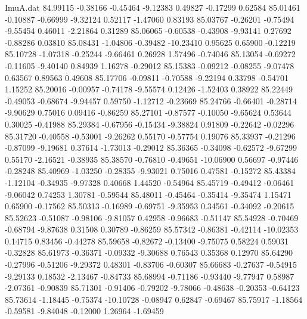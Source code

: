 \begin{filecontents}{ImuA.dat}
  84.99115   -0.38166   -0.45464   -9.12383    0.49827   -0.17299    0.62584
  85.01461   -0.10887   -0.66999   -9.32124    0.52117   -1.47060    0.83193
  85.03767   -0.26201   -0.75494   -9.55454    0.46011   -2.21864    0.31289
  85.06065   -0.60538   -0.43908   -9.93141    0.27692   -0.88286    0.03810
  85.08431   -1.04806   -0.39482  -10.23410    0.95625    0.65900   -0.12219
  85.10728   -1.07318   -0.25244   -9.66461    0.26928    1.57496   -0.74046
  85.13054   -0.69272   -0.11605   -9.40140    0.84939    1.16278   -0.29012
  85.15383   -0.09212   -0.08255   -9.07478    0.63567    0.89563    0.49608
  85.17706   -0.09811   -0.70588   -9.22194    0.33798   -0.54701    1.15252
  85.20016   -0.00957   -0.74178   -9.55574    0.12426   -1.52403    0.38922
  85.22449   -0.49053   -0.68674   -9.94457    0.59750   -1.12712   -0.23669
  85.24766   -0.66401   -0.28714   -9.90629    0.75016    0.09416   -0.86259
  85.27101   -0.87577   -0.10050   -9.65624    0.53644    0.30025   -0.41988
  85.29384   -0.67956   -0.15434   -9.38824    0.91809   -0.22642   -0.02296
  85.31720   -0.40558   -0.53001   -9.26262    0.55170   -0.57754    0.19076
  85.33937   -0.21296   -0.87099   -9.19681    0.37614   -1.73013   -0.29012
  85.36365   -0.34098   -0.62572   -9.67299    0.55170   -2.16521   -0.38935
  85.38570   -0.76810   -0.49651  -10.06900    0.56697   -0.97446   -0.28248
  85.40969   -1.03250   -0.28355   -9.93021    0.75016    0.47581   -0.15272
  85.43384   -1.12104   -0.34935   -9.97328    0.40668    1.44520   -0.54964
  85.45719   -0.49412   -0.06461   -9.06042    0.74253    1.30781   -0.59544
  85.48011   -0.45464   -0.35414   -9.35474    1.15471    0.65900   -0.17562
  85.50313   -0.16989   -0.69751   -9.35953    0.34561   -0.34092   -0.20615
  85.52623   -0.51087   -0.98106   -9.81057    0.42958   -0.96683   -0.51147
  85.54928   -0.70469   -0.68794   -9.87638    0.31508    0.30789   -0.86259
  85.57342   -0.86381   -0.42114  -10.02353    0.14715    0.83456   -0.44278
  85.59658   -0.82672   -0.13400   -9.75075    0.58224    0.59031   -0.32828
  85.61973   -0.36371   -0.09332   -9.30688    0.76543    0.35368    0.12970
  85.64290   -0.27996   -0.51206   -9.29372    0.48301   -0.83706   -0.60307
  85.66683   -0.27637   -0.54915   -9.29133    0.18532   -2.13467   -0.84733
  85.68994   -0.71186   -0.93440   -9.77947    0.58987   -2.07361   -0.90839
  85.71301   -0.91406   -0.79202   -9.78066   -0.48638   -0.20353   -0.64123
  85.73614   -1.18445   -0.75374  -10.10728   -0.08947    0.62847   -0.69467
  85.75917   -1.18564   -0.59581   -9.84048   -0.12000    1.26964   -1.69459

\end{filecontents}
